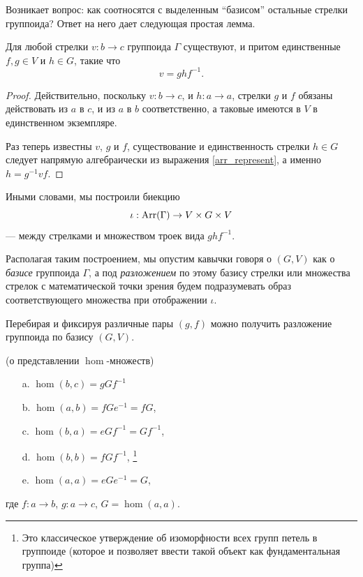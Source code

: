     Возникает вопрос: как соотносятся с выделенным ``базисом'' остальные 
    стрелки группоида? Ответ на него дает следующая простая лемма.

    \begin{lemma}\label{lm_1} Для любой стрелки $v : b \to c$ группоида 
        $\Gamma$ существуют, и притом единственные $f,g \in V$ и $h \in G$, 
        такие что
            \begin{equation}\label{arr_represent}
                v = ghf^{-1}.
            \end{equation}
    \end{lemma}
    \begin{proof}
        Действительно, поскольку $v : b \to c$, и $h : a \to a$, стрелки $g$ и 
        $f$ обязаны действовать из $a$ в $c$, и из $a$ в $b$ соответственно, а 
        таковые имеются в $V$ в единственном экземпляре.
        
        Раз теперь известны $v$, $g$ и $f$, существование и единственность 
        стрелки $h \in G$ следует напрямую алгебраически из выражения 
        \eqref{arr_represent}, а именно $h = g^{-1}vf$.
    \end{proof}
    
    Иными словами, мы построили биекцию 
    \begin{equation}\label{iota}
        \iota : \operatorname*{Arr}(\Gamma) \to V \times G \times V
    \end{equation}
     --- между стрелками и множеством троек вида $ghf^{-1}$.

    Располагая таким построением, мы опустим кавычки говоря о $(G,V)$ как о 
    \emph{базисе} группоида $\Gamma$, а под \emph{разложением} по этому базису 
    стрелки или множества стрелок с математической точки зрения будем 
    подразумевать образ соответствующего множества при отображении $\iota$.

    Перебирая и фиксируя различные пары $(g,f)$ можно получить разложение 
    группоида по базису $(G, V)$.
    
    \begin{corollary}\label{cor_repres} (о представлении $\hom$-множеств)
        \begin{itemize}
            \item[a.] $\hom(b,c) = gGf^{-1}$
            \item[b.] $\hom(a,b) = fGe^{-1} = fG$,
            \item[c.] $\hom(b,a) = eGf^{-1} = Gf^{-1}$,
            \item[d.] $\hom(b,b) = fGf^{-1}$, \footnote{Это классическое 
            утверждение об изоморфности всех групп петель в группоиде (которое 
            и позволяет ввести такой объект как фундаментальная группа)}
            \item[e.] $\hom(a,a) = eGe^{-1} = G$,
        \end{itemize}
        где $f : a \to b$, $g : a \to c$, $G = \hom(a,a)$.
    \end{corollary}

